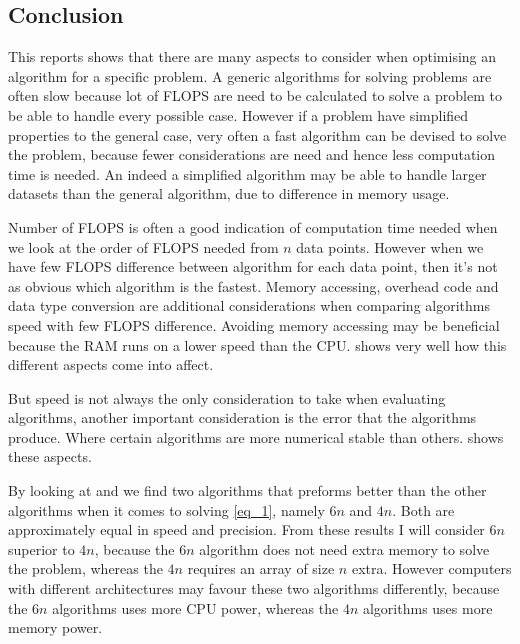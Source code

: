 \documentclass[11pt,english,a4paper]{article}
\begin{document}
\begin{flushleft}



\section{Conclusion}

This reports shows that there are many aspects to consider when optimising an algorithm for a specific problem. A generic algorithms for solving problems are often slow because lot of FLOPS are need to be calculated to solve a problem to be able to handle every possible case. However if a problem have simplified properties to the general case, very often a fast algorithm can be devised to solve the problem, because fewer considerations are need and hence less computation time is needed. An indeed a simplified algorithm may be able to handle larger datasets than the general algorithm, due to difference in memory usage. \linebreak

Number of FLOPS is often a good indication of computation time needed when we look at the order of FLOPS needed from $n$ data points. However when we have few FLOPS difference between algorithm for each data point, then it's not as obvious which algorithm is the fastest. Memory accessing, overhead code and data type conversion are additional considerations when comparing algorithms speed with few FLOPS difference. Avoiding memory accessing may be beneficial because the RAM runs on a lower speed than the CPU.  shows very well how this different aspects come into affect. \linebreak

But speed is not always the only consideration to take when evaluating algorithms, another important consideration is the error that the algorithms produce. Where certain algorithms are more numerical stable than others.  shows these aspects. \linebreak

By looking at  and  we find two algorithms that preforms better than the other algorithms when it comes to solving \eqref{eq_1}, namely $6n$ and $4n$. Both are approximately equal in speed and precision. From these results I will consider $6n$ superior to $4n$, because the $6n$ algorithm does not need extra memory to solve the problem, whereas the $4n$ requires an array of size $n$ extra. However computers with different architectures may favour these two algorithms differently, because the $6n$ algorithms uses more CPU power, whereas the $4n$ algorithms uses more memory power.


\end{flushleft}
\end{document}

